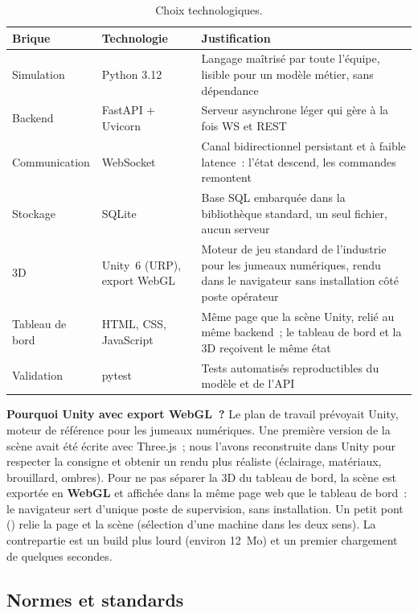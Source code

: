 \begin{table}[H]
\centering
\caption{Choix technologiques.}
\label{tab:techno}
\begin{tabularx}{\textwidth}{@{}l l X@{}}
\toprule
\textbf{Brique} & \textbf{Technologie} & \textbf{Justification} \\
\midrule
Simulation & Python 3.12 & Langage maîtrisé par toute l'équipe, lisible pour un modèle métier, sans dépendance \\
Backend & FastAPI + Uvicorn~\cite{fastapi} & Serveur asynchrone léger qui gère à la fois \ac{WS} et \ac{REST} \\
Communication & WebSocket~\cite{rfc6455} & Canal bidirectionnel persistant et à faible latence~: l'état descend, les commandes remontent \\
Stockage & SQLite & Base \ac{SQL} embarquée dans la bibliothèque standard, un seul fichier, aucun serveur \\
\ac{3D} & Unity~6 (URP), export WebGL~\cite{unity6} & Moteur de jeu standard de l'industrie pour les jumeaux numériques, rendu dans le navigateur sans installation côté poste opérateur \\
Tableau de bord & HTML, CSS, JavaScript & Même page que la scène Unity, relié au même backend~; le tableau de bord et la \ac{3D} reçoivent le même état \\
Validation & pytest & Tests automatisés reproductibles du modèle et de l'\ac{API} \\
\bottomrule
\end{tabularx}
\end{table}

\begin{callout}
\textbf{Pourquoi Unity avec export WebGL~?} Le plan de travail prévoyait Unity, moteur de référence pour les jumeaux numériques. Une première version de la scène avait été écrite avec Three.js~; nous l'avons reconstruite dans Unity pour respecter la consigne et obtenir un rendu plus réaliste (éclairage, matériaux, brouillard, ombres). Pour ne pas séparer la \ac{3D} du tableau de bord, la scène est exportée en \textbf{WebGL} et affichée dans la même page web que le tableau de bord~: le navigateur sert d'unique poste de supervision, sans installation. Un petit pont () relie la page et la scène (sélection d'une machine dans les deux sens). La contrepartie est un build plus lourd (environ 12~Mo) et un premier chargement de quelques secondes.
\end{callout}

\subsection{Normes et standards}

